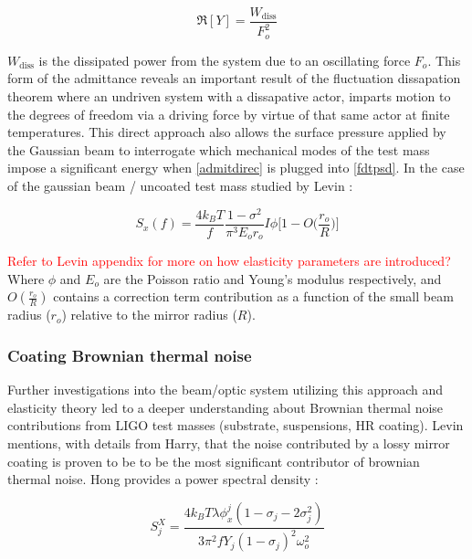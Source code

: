 \begin{equation}\label{admitdirec}
\Re[Y] = \frac{W_\mathrm{diss}}{F_o^2}
\end{equation}

\noindent $W_\mathrm{diss}$ is the dissipated power from the system due to an oscillating force $F_o$. This form of the admittance reveals an important result of the fluctuation dissapation theorem where an undriven system with a dissapative actor, imparts motion to the degrees of freedom via a driving force by virtue of that same actor at finite temperatures. This direct approach also allows the surface pressure applied by the Gaussian beam to interrogate which mechanical modes of the test mass impose a significant energy when \ref{admitdirec} is plugged into \ref{fdtpsd}. In the case of the gaussian beam / uncoated test mass studied by Levin \cite{levin:1998}:

\begin{equation}
S_x(f) = \frac{4 k_B T}{f} \frac{1-\sigma^2}{\pi^3 E_o r_o} I\phi \bigg[1- O\bigg( \frac{r_o}{R} \bigg)\bigg]
\end{equation}


\textcolor{red}{Refer to Levin appendix for more on how elasticity parameters are introduced?} Where $\phi$ and $E_o$ are the Poisson ratio and Young's modulus respectively, and $O(\frac{r_o}{R})$ contains a correction term contribution as a function of the small beam radius ($r_o$) relative to the mirror radius ($R$).

\subsubsection{Coating Brownian thermal noise}
Further investigations into the beam/optic system utilizing this approach and elasticity theory led to a deeper understanding about Brownian thermal noise contributions from LIGO test masses (substrate, suspensions, HR coating). Levin mentions, with details from Harry, that the noise contributed by a lossy mirror coating is proven to be to be the most significant contributor of brownian thermal noise. Hong provides a power spectral density \cite{Hong:2013}:

\begin{equation}
S_j^X = \frac{4k_B T \lambda \phi_x^j(1- \sigma_j - 2 \sigma_j^2)}{3 \pi^2 f Y_j (1-\sigma_j)^2 \omega_o^2}
\end{equation}

